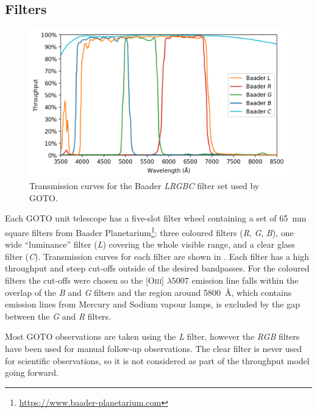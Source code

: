 
\subsection{Filters}
\label{sec:filters}
\begin{colsection}

\begin{figure}[t]
    \begin{center}
        \includegraphics[width=\linewidth]{images/throughput/trans_filters.png}
    \end{center}
    \caption[Baader filter transmission curves]{
        Transmission curves for the Baader \textit{LRGBC} filter set used by GOTO.\
    }\label{fig:filters}
\end{figure}

Each GOTO unit telescope has a five-slot filter wheel containing a set of \SI{65}{\milli\metre} square filters from Baader Planetarium\footnote{\url{https://www.baader-planetarium.com}}: three coloured filters (\textit{R}, \textit{G}, \textit{B}), one wide ``luminance'' filter (\textit{L}) covering the whole visible range, and a clear glass filter ({\textit{C}}). Transmission curves for each filter are shown in . Each filter has a high throughput and steep cut-offs outside of the desired bandpasses. For the coloured filters the cut-offs were chosen so the [O\textsc{iii}] $\lambda 5007$ emission line falls within the overlap of the \textit{B} and \textit{G} filters and the region around \SI{5800}{\angstrom}, which contains emission lines from Mercury and Sodium vapour lamps, is excluded by the gap between the \textit{G} and \textit{R} filters.

Most GOTO observations are taken using the \textit{L} filter, however the \textit{RGB} filters have been used for manual follow-up observations. The clear filter is never used for scientific observations, so it is not considered as part of the throughput model going forward.


\end{colsection}
